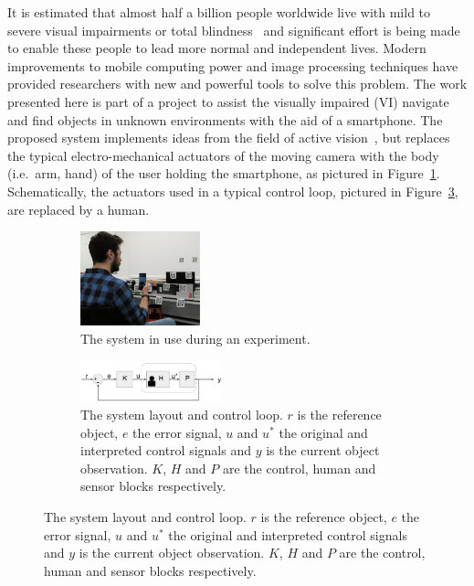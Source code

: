 \documentclass[a4paper, twoside]{article}
\begin{document}
\noindent It is estimated that almost half a billion people worldwide live with mild to severe visual impairments or total blindness~\cite{bourne2017magnitude} and significant effort is being made to enable these people to lead more normal and independent lives. Modern improvements to mobile computing power and image processing techniques have provided researchers with new and powerful tools to solve this problem.
The work presented here is part of a project to assist the visually impaired (VI) navigate and find objects in unknown environments with the aid of a smartphone. The proposed system implements ideas from the field of active vision~\cite{Bajcsy2017}, but replaces the typical electro-mechanical actuators of the moving camera with the body (i.e.\ arm, hand) of the user holding the smartphone, as pictured in Figure~\ref{fig:system-use}. Schematically, the actuators used in a typical control loop, pictured in Figure~\ref{fig:control-loop}, are replaced by a human. %

\begin{figure}
  \centering
  \begin{subfigure}
    \centering
    \includegraphics[width=0.38\textwidth]{figures/system_use.png}
    \caption{The system in use during an experiment. }\label{fig:system-use}
  \end{subfigure}
  \hspace{8mm}
  \begin{subfigure}
    \centering
    \includegraphics[width=0.45\textwidth]{figures/control_loop.png}
    \caption{The system layout and control loop. $r$ is the reference object, $e$ the error signal, $u$ and $u^*$ the original and interpreted control signals and $y$ is the current object observation. $K$, $H$ and $P$ are the control, human and sensor blocks respectively. }\label{fig:control-loop}
  \end{subfigure}
\end{figure}
\end{document}
